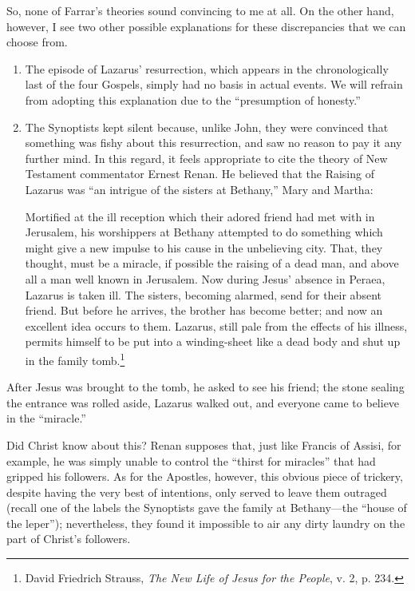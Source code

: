 So, none of Farrar's theories sound convincing to me at all. On the other hand, however, I see two other possible explanations for these discrepancies that we can choose from.

\begin{enumerate}
    \item[1.] The episode of Lazarus' resurrection, which appears in the chronologically last of the four Gospels, simply had no basis in actual events. We will refrain from adopting this explanation due to the ``presumption of honesty.''
    \item[2.] The Synoptists kept silent because, unlike John, they were convinced that something was fishy about this resurrection, and saw no reason to pay it any further mind. In this regard, it feels appropriate to cite the theory of New Testament commentator Ernest Renan. He believed that the Raising of Lazarus was ``an intrigue of the sisters at Bethany,'' Mary and Martha:

    \begin{smallquote}
        Mortified at the ill reception which their adored friend had met with in Jerusalem, his worshippers at Bethany attempted to do something which might give a new impulse to his cause in the unbelieving city. That, they thought, must be a miracle, if possible the raising of a dead man, and above all a man well known in Jerusalem. Now during Jesus' absence in Peraea, Lazarus is taken ill. The sisters, becoming alarmed, send for their absent friend. But before he arrives, the brother has become better; and now an excellent idea occurs to them. Lazarus, still pale from the effects of his illness, permits himself to be put into a winding-sheet like a dead body and shut up in the family tomb.\footnote{David Friedrich Strauss, \emph{The New Life of Jesus for the People}, v. 2, p. 234.}
    \end{smallquote}
\end{enumerate}
After Jesus was brought to the tomb, he asked to see his friend; the stone sealing the entrance was rolled aside, Lazarus walked out, and everyone came to believe in the ``miracle.''

Did Christ know about this? Renan supposes that, just like Francis of Assisi, for example, he was simply unable to control the ``thirst for miracles'' that had gripped his followers. As for the Apostles, however, this obvious piece of trickery, despite having the very best of intentions, only served to leave them outraged (recall one of the labels the Synoptists gave the family at Bethany---the ``house of the leper''); nevertheless, they found it impossible to air any dirty laundry on the part of Christ's followers.


